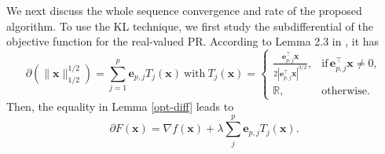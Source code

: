\documentclass{article}
\numberwithin{equation}{section}
\begin{document}
We next discuss the whole sequence
convergence and rate of the proposed algorithm. To use the KL technique, we first study the subdifferential of the objective function for the real-valued PR. According to Lemma 2.3 in \cite{wu2023regularized}, it has
$$\partial(\|\mathbf{x}\|_{1/2}^{1/2})=\sum_{j=1}^p\mathbf{e}_{p,j} T_j(\mathbf{x})~\mbox{with}~T_j(\mathbf{x})=
\begin{cases}
	\frac{\mathbf{e}_{p,j}^\top \mathbf{x}}{2|\mathbf{e}_{p,j}^\top \mathbf{x}|^{3/2}},&{\mbox{if}\, \mathbf{e}_{p,j}^\top \mathbf{x}\neq0},\\
	{\mathbb{R},}&{\mbox{otherwise}}.
\end{cases}$$
Then, the equality in Lemma \ref{opt-diff} leads to
$$\partial F(\mathbf{x})=\nabla f(\mathbf{x})+\lambda\sum_j^p\mathbf{e}_{p,j}T_j(\mathbf{x}).$$
\end{document}
